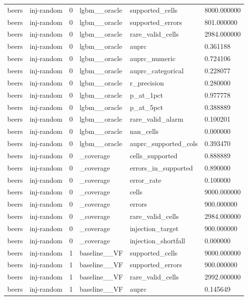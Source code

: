 \begin{tabular}{llllll}
beers & inj-random & 0 & lgbm\_\_oracle & supported\_cells & 8000.000000 \\
beers & inj-random & 0 & lgbm\_\_oracle & supported\_errors & 801.000000 \\
beers & inj-random & 0 & lgbm\_\_oracle & rare\_valid\_cells & 2984.000000 \\
beers & inj-random & 0 & lgbm\_\_oracle & auprc & 0.361188 \\
beers & inj-random & 0 & lgbm\_\_oracle & auprc\_numeric & 0.724106 \\
beers & inj-random & 0 & lgbm\_\_oracle & auprc\_categorical & 0.228077 \\
beers & inj-random & 0 & lgbm\_\_oracle & r\_precision & 0.280000 \\
beers & inj-random & 0 & lgbm\_\_oracle & p\_at\_1pct & 0.977778 \\
beers & inj-random & 0 & lgbm\_\_oracle & p\_at\_5pct & 0.388889 \\
beers & inj-random & 0 & lgbm\_\_oracle & rare\_valid\_alarm & 0.100201 \\
beers & inj-random & 0 & lgbm\_\_oracle & nan\_cells & 0.000000 \\
beers & inj-random & 0 & lgbm\_\_oracle & auprc\_supported\_cols & 0.393470 \\
beers & inj-random & 0 & \_coverage & cells\_supported & 0.888889 \\
beers & inj-random & 0 & \_coverage & errors\_in\_supported & 0.890000 \\
beers & inj-random & 0 & \_coverage & error\_rate & 0.100000 \\
beers & inj-random & 0 & \_coverage & cells & 9000.000000 \\
beers & inj-random & 0 & \_coverage & errors & 900.000000 \\
beers & inj-random & 0 & \_coverage & rare\_valid\_cells & 2984.000000 \\
beers & inj-random & 0 & \_coverage & injection\_target & 900.000000 \\
beers & inj-random & 0 & \_coverage & injection\_shortfall & 0.000000 \\
beers & inj-random & 1 & baseline\_\_VF & supported\_cells & 9000.000000 \\
beers & inj-random & 1 & baseline\_\_VF & supported\_errors & 900.000000 \\
beers & inj-random & 1 & baseline\_\_VF & rare\_valid\_cells & 2992.000000 \\
beers & inj-random & 1 & baseline\_\_VF & auprc & 0.145649 \\

\end{tabular}
